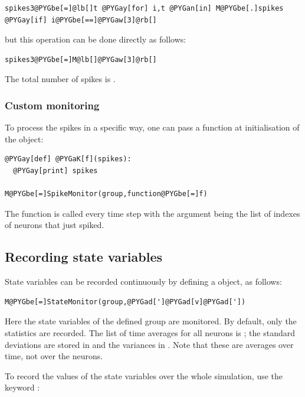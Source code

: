 \documentclass[letterpaper,10pt,english]{manual}
\begin{document}
\begin{Verbatim}[commandchars=@\[\]]
spikes3@PYGbe[=]@lb[]t @PYGay[for] i,t @PYGan[in] M@PYGbe[.]spikes @PYGay[if] i@PYGbe[==]@PYGaw[3]@rb[]
\end{Verbatim}

but this operation can be done directly as follows:

\begin{Verbatim}[commandchars=@\[\]]
spikes3@PYGbe[=]M@lb[]@PYGaw[3]@rb[]
\end{Verbatim}

The total number of spikes is .


\subsubsection{Custom monitoring}

To process the spikes in a specific way, one can pass a function at initialisation of the
\hyperlink{brian.SpikeMonitor}{} object:

\begin{Verbatim}[commandchars=@\[\]]
@PYGay[def] @PYGaK[f](spikes):
  @PYGay[print] spikes

M@PYGbe[=]SpikeMonitor(group,function@PYGbe[=]f)
\end{Verbatim}

The function  is called every time step with the argument  being the list of
indexes of neurons that just spiked.


\subsection{Recording state variables}

State variables can be recorded continuously by defining a \hyperlink{brian.StateMonitor}{} object, as follows:

\begin{Verbatim}[commandchars=@\[\]]
M@PYGbe[=]StateMonitor(group,@PYGad[']@PYGad[v]@PYGad['])
\end{Verbatim}

Here the state variables  of the defined group are monitored. By default, only the statistics
are recorded. The list of time averages for all neurons is ; the standard deviations are stored
in  and the variances in . Note that these are averages over time, not over the neurons.

To record the values of the state variables over the whole simulation, use the keyword :
\end{document}
